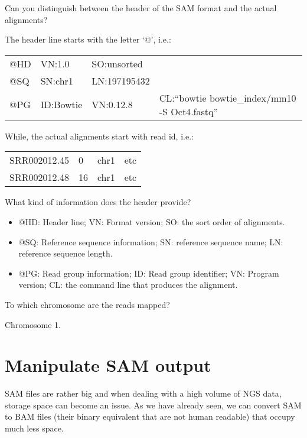 \begin{questions}
Can you distinguish between the header of the SAM format and the actual alignments?
\begin{answer}
The header line starts with the letter `@', i.e.: 

\begin{tabular}{llll}
@HD & VN:1.0 & SO:unsorted & \\
@SQ & SN:chr1 & LN:197195432 & \\
@PG & ID:Bowtie &      VN:0.12.8  & CL:``bowtie bowtie\_index/mm10 -S
Oct4.fastq'' \\
\end{tabular}

While, the actual alignments start with read id, i.e.:

\begin{tabular}{llll}
SRR002012.45 & 0 & chr1 & etc \\
SRR002012.48 & 16 & chr1 & etc \\
\end{tabular}
\end{answer}

What kind of information does the header provide?
\begin{answer}
\begin{itemize}
  \item @HD: Header line; VN: Format version; SO: the sort order of alignments.
  \item @SQ: Reference sequence information; SN: reference sequence name; LN: reference sequence length.
  \item @PG: Read group information; ID: Read group identifier; VN: Program version; CL: the command line that produces the alignment.
\end{itemize}
\end{answer}

To which chromosome are the reads mapped? 
\begin{answer}
Chromosome 1.
\end{answer}
\end{questions}

\section{Manipulate SAM output}

\begin{note}
SAM files are rather big and when dealing with a high volume of NGS data,
storage space can become an issue. As we have already seen, we can convert SAM
to BAM files (their binary equivalent that are not human readable) that occupy
much less space.
\end{note}

